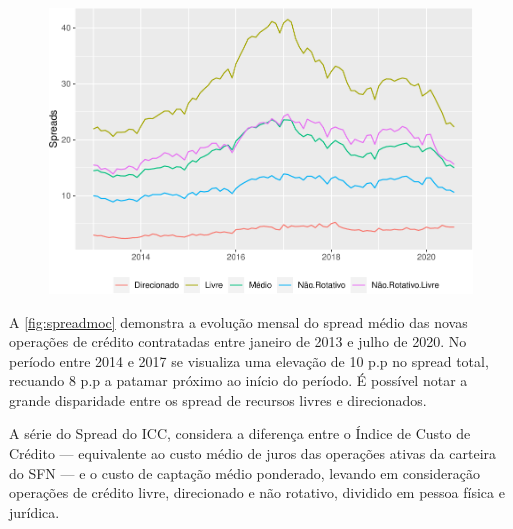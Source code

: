 \documentclass[12pt,openright,oneside,a4paper,chapter=TITLE,section=TITLE,subsection=Title,english,french,spanish,portugues,sumario=tradicional]{04-class-files/abntex2}
\begin{document}
\begin{figure}

\begin{center}\includegraphics{12-exportedfigures/spread 2019 moc-1} \end{center}
\label{fig:spreadmoc}
\end{figure}

A \autoref{fig:spreadmoc} demonstra a evolução mensal do spread médio das novas
operações de crédito contratadas entre janeiro de 2013 e julho de 2020. No
período entre 2014 e 2017 se visualiza uma elevação de 10 p.p no spread total, recuando 8 p.p a patamar próximo ao início do período. É possível notar a grande disparidade entre os spread de recursos livres e direcionados.

A série do Spread do ICC, considera a diferença entre o Índice de Custo de
Crédito --- equivalente ao custo médio de juros das operações ativas da carteira
do SFN --- e o custo de captação médio ponderado, levando em consideração
operações de crédito livre, direcionado e não rotativo, dividido em pessoa
física e jurídica.
\end{document}
